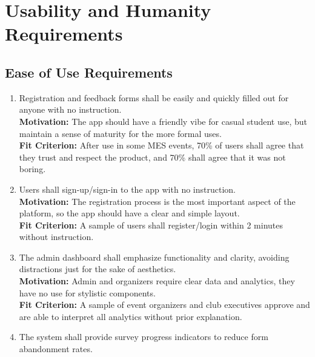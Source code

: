 \documentclass[12pt]{article}
\begin{document}
\section{Usability and Humanity Requirements}
\subsection{Ease of Use Requirements}

\begin{enumerate}[label=UHR-EoU.\arabic*, wide=0pt, leftmargin=*]
  \item Registration and feedback forms shall be easily and quickly filled out for anyone with no instruction.\\[2mm]
    {\bf Motivation:} The app should have a friendly vibe for casual student use, but maintain a sense of maturity for the more formal uses.\\
    {\bf Fit Criterion:} After use in some MES events, 70\% of users shall agree that they trust and respect the product, and 70\% shall agree that it was not boring.
  \item Users shall sign-up/sign-in to the app with no instruction. \\[2mm]
    {\bf Motivation:} The registration process is the most important aspect of the platform, so the app should have a clear and simple layout.\\
    {\bf Fit Criterion:} A sample of users shall register/login within 2 minutes without instruction.
  \item The admin dashboard shall emphasize functionality and clarity, avoiding distractions just for the sake of aesthetics.\\[2mm]
    {\bf Motivation:} Admin and organizers require clear data and analytics, they have no use for stylistic components.\\
    {\bf Fit Criterion:} A sample of event organizers and club executives approve and are able to interpret all analytics without prior explanation.
  \item The system shall provide survey progress indicators to reduce form abandonment
    rates.
\end{enumerate}
\end{document}

